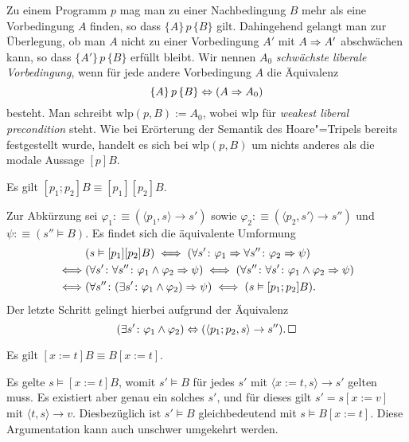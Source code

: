 Zu einem Programm $p$ mag man zu einer Nachbedingung $B$ mehr als eine
Vorbedingung $A$ finden, so dass $\{A\}\,p\,\{B\}$ gilt. Dahingehend
gelangt man zur Überlegung, ob man $A$ nicht zu einer Vorbedingung $A'$
mit $A\Rightarrow A'$ abschwächen kann, so dass $\{A'\}\,p\,\{B\}$ erfüllt
bleibt. Wir nennen $A_0$ \emph{schwächste liberale Vorbedingung},
wenn für jede andere Vorbedingung $A$ die Äquivalenz
\[\{A\}\,p\,\{B\}\Leftrightarrow (A\Rightarrow A_0)\]
besteht. Man schreibt $\mathrm{wlp}(p,B):=A_0$, wobei $\mathrm{wlp}$ für
\emph{weakest liberal precondition} steht. Wie bei Erörterung der
Semantik des Hoare"=Tripels bereits festgestellt wurde, handelt es sich
bei $\mathrm{wlp}(p,B)$ um nichts anderes als die modale Aussage $[p]B$.

\begin{Satz}
Es gilt $[p_1;p_2]B\equiv [p_1][p_2]B$.
\end{Satz}
\begin{Beweis}
Zur Abkürzung sei $\varphi_1:\equiv(\langle p_1,s\rangle\to s')$ sowie
$\varphi_2:\equiv(\langle p_2,s'\rangle\to s'')$ und $\psi:\equiv (s''\models B)$.
Es findet sich die äquivalente Umformung
\begin{align*}
&(s\vDash [p_1][p_2]B) \iff (\forall s'\colon\varphi_1\Rightarrow \forall s''\colon\varphi_2\Rightarrow\psi)\\
\iff &(\forall s'\colon\forall s''\colon\varphi_1\land\varphi_2\Rightarrow\psi)
\iff (\forall s''\colon\forall s'\colon\varphi_1\land\varphi_2\Rightarrow\psi)\\
\iff &(\forall s''\colon (\exists s'\colon\varphi_1\land\varphi_2)\Rightarrow\psi)
\iff (s\vDash [p_1;p_2]B).
\end{align*}
Der letzte Schritt gelingt hierbei aufgrund der Äquivalenz
\[(\exists s'\colon\varphi_1\land\varphi_2)\Leftrightarrow
(\langle p_1;p_2,s\rangle\to s'').\,\Box\]
\end{Beweis}

\begin{Satz}
Es gilt $[x:=t]B\equiv B[x:=t]$.
\end{Satz}
\begin{Beweis}
Es gelte $s\models [x:=t]B$, womit $s'\models B$ für jedes $s'$ mit
$\langle x:=t,s\rangle\to s'$ gelten muss. Es existiert aber genau ein
solches $s'$, und für dieses gilt $s'=s[x:=v]$ mit
$\langle t,s\rangle\to v$. Diesbezüglich ist $s'\models B$ gleichbedeutend
mit $s\models B[x:=t]$. Diese Argumentation kann auch
unschwer umgekehrt werden.\,\qedsymbol
\end{Beweis}

